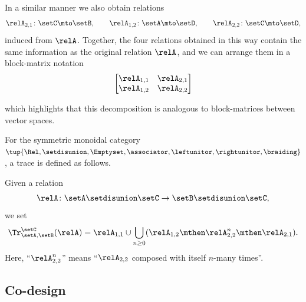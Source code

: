     In a similar manner we also obtain relations
    \begin{equation}
        \relA_{2, 1} \colon \setC \mto \setB, \qquad \relA_{1, 2} \colon \setA \mto \setD, \qquad \relA_{2, 2} \colon \setC \mto \setD,
    \end{equation}
    induced from $\relA$. Together, the four relations obtained in this way contain the same information as the original relation $\relA$, and we can arrange them in a block-matrix notation
    \begin{equation}
\begin{bmatrix}
  \relA_{1,1} & \relA_{2,1} \\
  \relA_{1,2} & \relA_{2,2}
\end{bmatrix}
\end{equation}

which highlights that this decomposition is analogous to block-matrices between vector spaces. 

\begin{ctdefinition}
   For the symmetric monoidal category $\tup{\Rel, \setdisunion, \Emptyset, \associator, \leftunitor, \rightunitor, \braiding}$, a trace is defined as follows.

Given a relation  
   \begin{equation}
       \relA \colon \setA \setdisunion \setC \to \setB \setdisunion \setC,
    \end{equation}
    we set 
    \begin{equation}\label{eq:trace-rel-sum}
        \Tr_{\setA,\setB}^\setC (\relA) = \relA_{1,1} \cup \bigcup_{n \geq 0} ( \relA_{1,2} \mthen \relA_{2,2}^n \mthen \relA_{2,1} ).
    \end{equation}
   Here, ``$\relA_{2,2}^n$'' means ``$\relA_{2,2}$ composed with itself $n$-many times''.
\end{ctdefinition}

\subsection{Co-design}

\begin{marginfigure}
    \centering
    \caption{Design problem with a resource and a functionality of the same type.
    }
    \label{fig:extrace_1}
\end{marginfigure}

\begin{marginfigure}
    \centering
    \caption{Closing the loop in the design problem.}
    \label{fig:extrace_2}
\end{marginfigure}

